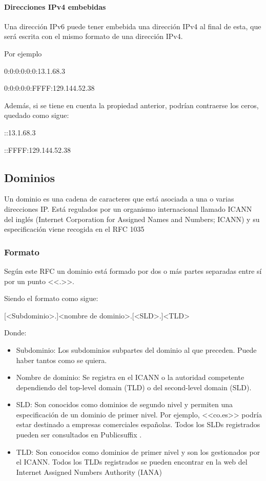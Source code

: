 \paragraph{Direcciones IPv4 embebidas}
Una dirección IPv6 puede tener embebida una dirección IPv4 al final de esta, que será escrita con el mismo formato de una dirección IPv4. 

Por ejemplo 

    0:0:0:0:0:0:13.1.68.3

    0:0:0:0:0:FFFF:129.144.52.38
    
Además, si se tiene en cuenta la propiedad anterior, podrían contraerse los ceros, quedado como sigue: 

    ::13.1.68.3

    ::FFFF:129.144.52.38

\subsection{Dominios}
Un dominio es una cadena de caracteres que está asociada a una o varias direcciones IP. Está regulados por un organismo internacional llamado ICANN del inglés (Internet Corporation for Assigned Names and Numbers; ICANN) \cite{icann} y su especificación viene recogida en el RFC 1035 \cite{rfc1035}

\subsubsection{Formato}
Según este RFC un dominio está formado por dos o más partes separadas entre sí por un punto <<.>>. 

Siendo el formato como sigue: 

[<Subdominio>.]<nombre de dominio>.[<SLD>.]<TLD>

Donde: 
\begin{itemize}
    \item Subdominio: Los subdominios subpartes del dominio al que preceden. Puede haber tantos como se quiera.
    \item Nombre de dominio: Se registra en el ICANN o la autoridad competente dependiendo del top-level domain (TLD) o del second-level domain (SLD).
    \item SLD: Son conocidos como dominios de segundo nivel y permiten una especificación de un dominio de primer nivel. Por ejemplo, <<co.es>> podría estar destinado a empresas comerciales españolas. Todos los SLDs registrados pueden ser consultados en Publicsuffix \cite{SLD_list}.
    \item TLD: Son conocidos como dominios de primer nivel y son los gestionados por el ICANN. Todos los TLDs registrados se pueden encontrar en la web del Internet Assigned Numbers Authority (IANA) \cite{TLD_list}
\end{itemize}

